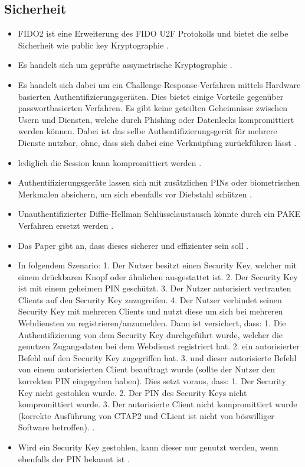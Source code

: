 \subsection{Sicherheit}

\begin{itemize}
    \item FIDO2 ist eine Erweiterung des FIDO U2F Protokolls und bietet die selbe Sicherheit wie public key Kryptographie \cite{lyastani2020fido2}.
    \item Es handelt sich um geprüfte assymetrische Kryptographie \cite{farke2020you}.
    \item Es handelt sich dabei um ein Challenge-Response-Verfahren mittels Hardware basierten Authentifizierungsgeräten. Dies bietet einige Vorteile gegenüber passwortbasierten Verfahren. Es gibt keine geteilten Geheimnisse zwischen Usern und Diensten, welche durch Phishing oder Datenlecks kompromittiert werden können. Dabei ist das selbe Authentifizierungsgerät für mehrere Dienste nutzbar, ohne, dass sich dabei eine Verknüpfung zurückführen lässt \cite{lyastani2020fido2} \cite{farke2020you}.
    \item lediglich die Session kann kompromittiert werden \cite{morii2017research}.
    \item Authentifizierungsgeräte lassen sich mit zusätzlichen PINs oder biometrischen Merkmalen absichern, um sich ebenfalls vor Diebstahl schützen \cite{barbosa2021provable}.
    \item Unauthentifizierter Diffie-Hellman Schlüsselaustausch könnte durch ein \ac{PAKE} Verfahren ersetzt werden \cite{barbosa2021provable}.
    \item Das Paper gibt an, dass dieses sicherer und effizienter sein soll \cite{barbosa2021provable}.
    \item In folgendem Szenario: 1. Der Nutzer besitzt einen Security Key, welcher mit einem drückbaren Knopf oder ähnlichen ausgestattet ist. 2. Der Security Key ist mit einem geheimen PIN geschützt. 3. Der Nutzer autorisiert vertrauten Clients auf den Security Key zuzugreifen. 4. Der Nutzer verbindet seinen Security Key mit mehreren Clients und nutzt diese um sich bei mehreren Webdiensten zu registrieren/anzumelden.
    Dann ist versichert, dass:
    1. Die Authentifizierung von dem Security Key durchgeführt wurde, welcher die genutzen Zugangsdaten bei dem Webdienst registriert hat.
    2. ein autorisierter Befehl auf den Security Key zugegriffen hat.
    3. und dieser autorisierte Befehl von einem autorisierten Client beauftragt wurde (sollte der Nutzer den korrekten PIN eingegeben haben).
    Dies setzt voraus, dass:
    1. Der Security Key nicht gestohlen wurde.
    2. Der PIN des Security Keys nicht kompromittiert wurde.
    3. Der autorisierte Client nicht kompromittiert wurde (korrekte Ausführung von \ac{CTAP2} und CLient ist nicht von böswilliger Software betroffen).
    \cite{barbosa2021provable}.
    \item Wird ein Security Key gestohlen, kann dieser nur genutzt werden, wenn ebenfalls der PIN bekannt ist \cite{barbosa2021provable}.
\end{itemize}
